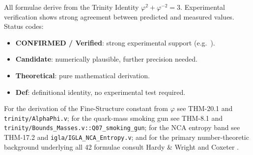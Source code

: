 All formulae derive from the Trinity Identity
$\varphi^{2}+\varphi^{-2}=3$.
Experimental verification shows strong agreement between predicted and
measured values.  Status codes:
\begin{itemize}
  \item \textbf{CONFIRMED / Verified}: strong experimental support
        (e.g.\ \cite{coldea2010,pdg2022,codata2022}).
  \item \textbf{Candidate}: numerically plausible, further precision needed.
  \item \textbf{Theoretical}: pure mathematical derivation.
  \item \textbf{Def}: definitional identity, no experimental test required.
\end{itemize}

For the derivation of the Fine-Structure constant from $\varphi$ see
THM-20.1 and \texttt{trinity/AlphaPhi.v};
for the quark-mass smoking gun see THM-8.1 and
\texttt{trinity/Bounds\_Masses.v::Q07\_smoking\_gun};
for the NCA entropy band see THM-17.2 and
\texttt{igla/IGLA\_NCA\_Entropy.v};
and for the primary number-theoretic background underlying all 42
formulae consult Hardy \& Wright \cite{hardy_wright}
and Coxeter \cite{coxeter_regular_polytopes}.
